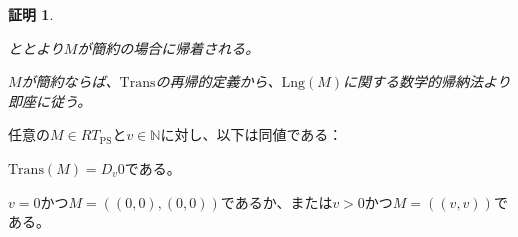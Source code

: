 \documentclass[dvipdfmx,uplatex]{jsarticle}
\theoremstyle{customnonumberbreakfortheorem}
\theoremstyle{customnonumberbreakforproof}
\newtheorem{hideableproof}{証明}
\begin{document}
\begin{hideableproof}
	\begin{indented}
		\item {}ととより\(M\)が簡約の場合に帰着される。
		\item \(M\)が簡約ならば、\(\textrm{Trans}\)の再帰的定義から、\(\textrm{Lng}(M)\)に関する数学的帰納法より即座に従う。
	\end{indented}
\end{hideableproof}

\begin{corollary}\label{Transと非可算基数の関係}
	任意の\(M \in RT_{\textrm{PS}}\)と\(v \in \mathbb{N}\)に対し、以下は同値である：
	\begin{penumerate}
		\item \(\textrm{Trans}(M) = D_v 0\)である。
		\item \(v = 0\)かつ\(M = ((0,0),(0,0))\)であるか、または\(v > 0\)かつ\(M = ((v,v))\)である。
	\end{penumerate}
\end{corollary}
\end{document}
